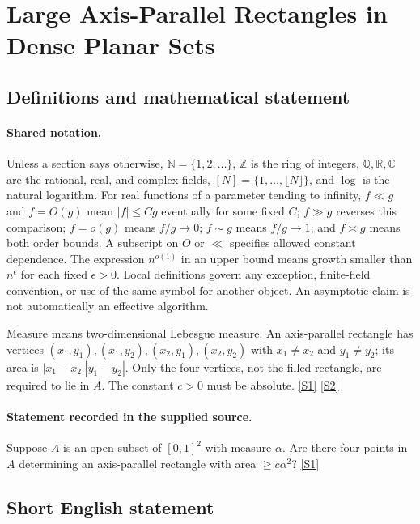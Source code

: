 \documentclass[11pt,a4paper]{article}
\newcommand{\N}{\mathbb{N}}
\newcommand{\Z}{\mathbb{Z}}
\newcommand{\Q}{\mathbb{Q}}
\newcommand{\R}{\mathbb{R}}
\newcommand{\C}{\mathbb{C}}
\newcommand{\sref}[2]{\hyperlink{source:#1:#2}{[S#2]}}
\begin{document}
\section{Large Axis-Parallel Rectangles in Dense Planar Sets}\label{statement}


\subsection{Definitions and mathematical statement}

\paragraph{Shared notation.}Unless a section says otherwise, $\N=\{1,2,\ldots\}$,
$\Z$ is the ring of integers, $\Q,\R,\C$ are the rational, real, and complex
fields, $[N]=\{1,\ldots,\lfloor N\rfloor\}$, and $\log$ is the natural
logarithm. For real functions of a parameter tending to infinity,
$f\ll g$ and $f=O(g)$ mean $|f|\leq Cg$ eventually for some fixed $C$;
$f\gg g$ reverses this comparison; $f=o(g)$ means $f/g\to0$;
$f\sim g$ means $f/g\to1$; and $f\asymp g$ means both order bounds.
A subscript on $O$ or $\ll$ specifies allowed constant dependence.
The expression $n^{o(1)}$ in an upper bound means growth smaller than
$n^\epsilon$ for each fixed $\epsilon>0$. Local definitions govern any
exception, finite-field convention, or use of the same symbol for another
object. An asymptotic claim is not automatically an effective algorithm.



Measure means two-dimensional Lebesgue measure. An axis-parallel rectangle has vertices $(x_1,y_1),(x_1,y_2),(x_2,y_1),(x_2,y_2)$ with $x_1\ne x_2$ and $y_1\ne y_2$; its area is $|x_1-x_2||y_1-y_2|$. Only the four vertices, not the filled rectangle, are required to lie in $A$. The constant $c>0$ must be absolute. \sref{statement}{1} \sref{statement}{2}

\paragraph{Statement recorded in the supplied source.}
Suppose $A$ is an open subset of $[0, 1]^2$ with measure $\alpha$. Are there four points in $A$ determining an axis-parallel rectangle with area $\geq c\alpha^2$? \sref{statement}{1}

\subsection{Short English statement}
\end{document}
